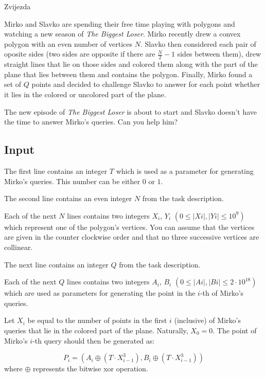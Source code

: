 \begin{statement}[
  problempoints=110,
  timelimit=1 second,
  memorylimit=512 MiB,
]{Zvijezda}

Mirko and Slavko are spending their free time playing with polygons and watching
a new season of \textit{The Biggest Loser}. Mirko recently drew a convex polygon
with an even number of vertices $N$. Slavko then considered each pair of oposite
sides (two sides are opposite if there are $\frac{N}{2}-1$ sides between them),
drew straight lines that lie on those sides and colored them along with the
part of the plane that lies between them and contains the polygon. Finally,
Mirko found a set of $Q$ points and decided to challenge Slavko to answer for
each point whether it lies in the colored or uncolored part of the plane.

The new episode of \textit{The Biggest Loser} is about to start and Slavko
doesn't have the time to answer Mirko's queries. Can you help him?

\subsection*{Input}
The first line contains an integer $T$ which is used as a parameter for
generating Mirko's queries. This number can be either $0$ or $1$.

The second line contains an even integer $N$ from the task description.

Each of the next $N$ lines contains two integers $X_i$, $Y_i$
$(0 \le |Xi|, |Yi| \le 10^9)$ which represent one of the polygon's vertices. You
can assume that the vertices are given in the counter clockwise order and that
no three successive vertices are collinear.

The next line contains an integer $Q$ from the task description.

Each of the next $Q$ lines contains two integers $A_i$, $B_i$
$(0 \le |Ai|, |Bi| \le 2\cdot10^{18})$ which are used as parameters for
generating the point in the $i$-th of Mirko's queries.

Let $X_i$ be equal to the number of points in the first $i$ (inclusive) of
Mirko's queries that lie in the colored part of the plane. Naturally, $X_0=0$.
The point of Mirko's $i$-th query should then be generated as:

\[P_i = (A_i \oplus (T \cdot X_{i-1}^{3}), B_i \oplus (T \cdot X_{i-1}^{3}))\]
where $\oplus$ represents the bitwise xor operation.


\end{statement}
